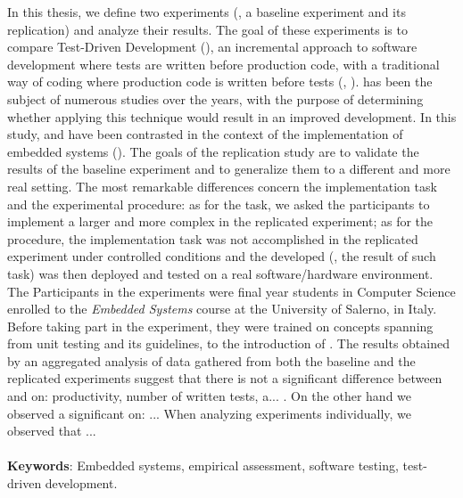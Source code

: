 In this thesis, we define two experiments (\ie, a baseline experiment and its replication) and analyze their results. The goal of these experiments is to compare Test-Driven Development (\tdd), an incremental approach to software development where tests are written before production code, with a traditional way of coding where production code is written before tests (\ie, \notdd). \tdd has been the subject of numerous studies over the years, with the purpose of determining whether applying this technique would result in an improved development. In this study, \tdd and \notdd have been contrasted in the context of the implementation of embedded systems (\ess). The goals of the replication study are to validate the results of the baseline experiment and to generalize them to a different and more real setting. The most remarkable differences concern the implementation task and the experimental procedure: as for the task, we asked the participants to implement a larger and more complex \es in the replicated experiment; as for the procedure, the implementation task was not accomplished in the replicated experiment under controlled conditions and the developed \es (\ie, the result of such task) was then deployed and tested on a real software/hardware environment.  
The Participants in the experiments were final year students in Computer Science enrolled to the \textit{Embedded Systems} course at the University of Salerno, in Italy. Before taking part in the experiment, they were trained on concepts spanning from unit testing and its guidelines, to the introduction of \tdd.
The results obtained by an aggregated analysis of data gathered from both the baseline and the replicated experiments suggest that there is not a significant difference between \tdd and \notdd on: productivity, number of written tests, a... . On the other hand we observed a significant on: ... When analyzing experiments individually, we observed that ... 
\\ \ \\
\noindent \textbf{Keywords}: Embedded systems, empirical assessment, software testing, test-driven development.